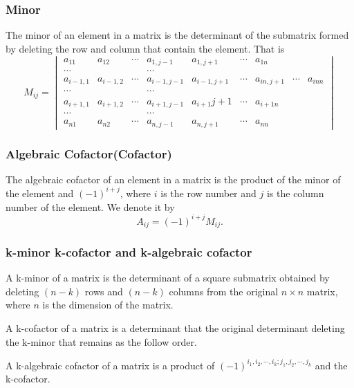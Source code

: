 \documentclass{article}
\theoremstyle{definition}
\begin{document}
\subsubsection{Minor}
The minor of an element in a matrix is the determinant 
of the submatrix formed by deleting the 
row and column that contain the element.
That is 
$$M_{ij}=
\begin{vmatrix}
    a_{11} & a_{12} & \cdots & a_{1,j-1} & a_{1,j+1} & \cdots & a_{1n}\\
    \cdots &  &  & \cdots\\
    a_{i-1,1} & a_{i-1,2} & \cdots & a_{i-1,j-1} & a_{i-1,j+1} & \cdots & a_{in,j+1} & \cdots & a_{inn}\\
    \cdots &  &  & \cdots\\
    a_{i+1,1} & a_{i+1,2} & \cdots & a_{i+1,j-1} & a_{i+1}j+1 & \cdots & a_{i+1n}\\
    \cdots &  &  & \cdots\\
    a_{n1} & a_{n2} & \cdots & a_{n,j-1} & a_{n,j+1} & \cdots & a_{nn}
\end{vmatrix}$$

\subsubsection{Algebraic Cofactor(Cofactor)}
The algebraic cofactor of an element in a matrix is the product of the minor of the element and 
$(-1)^{i+j}$, where $i$ is the row number and $j$ is the column number of the element. 
We denote it by 
$$A_{ij}=(-1)^{i+j}M_{ij}.$$
\subsubsection{k-minor  k-cofactor and k-algebraic cofactor}
A k-minor of a matrix is the determinant of a 
square submatrix obtained by deleting $(n-k)$ 
rows and $(n-k)$ columns from the original $n×n$ 
matrix, where $n$ is the dimension of the matrix.

A k-cofactor of a matrix is a determinant that the original determinant deleting the 
k-minor that remains as the follow order.

A k-algebraic cofactor of a matrix is a product of $(-1)^{i_{1},i_{2},\cdots,i_{k};j_{1},j_{2},\cdots,j_{k}}$
 and the k-cofactor.
\end{document}
